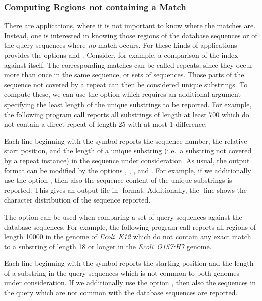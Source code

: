 \documentclass[12pt,titlepage]{article}
\newcommand{\EcoliKtwelve}[0]{\emph{Ecoli~K12}\index{Ecoli~K12}\xspace}
\newcommand{\EcoliH}[0]{\emph{Ecoli~O157:H7}\index{Ecoli~O157:H7}\xspace}
\newcommand{\EXECUTE}[1]{}
\begin{document}
\begin{AboutVmatch}
\subsubsection{Computing Regions not containing a Match}

There are applications, where it is not important to know where the matches
are. Instead, one is interested in knowing those regions of the database
sequences or of the query sequences where \emph{no} match occurs. 
For these kinds of applications
\VM provides the options  and .
Consider, for example, a comparison of the index against itself. The 
corresponding matches can be called repeats, since they occur more than once 
in the same sequence, or sets of sequences. Those parts of the sequence not
covered by a repeat can then be considered unique substrings. To 
compute these, we can use the option  which requires an 
additional argument specifying the least length of the unique substrings
to be reported. For example, the following program 
call reports all substrings of length
at least 700 which do not contain a direct repeat of length 25 with at
most 1 difference:

\EXECUTE{vmatch -dbnomatch 700 -l 25 -e 1 atEST}

Each line beginning with the symbol \Fastastart
reports the sequence number, the relative start position,
and the length of a unique substring (i.e.\ a substring not covered by
a repeat instance) in the sequence under consideration.
As usual, the output format can be modified by the options
, , , and
. For example, if we additionally use the option 
, then also the sequence content
of the unique substrings is reported. This gives an output file in 
\Fasta-format. Additionally, the \texttt{}-line
shows the character distribution of the sequence reported.

The option  can be used when comparing 
a set of query sequences against the database sequences.
For example, the following program call reports all regions of length 10000 in 
the genome of \EcoliKtwelve which do not contain any exact match to
a substring of length 18 or longer in the \EcoliH genome.

\EXECUTE{vmatch -qnomatch 10000 -q EcoliK12 -l 18 EcoliO157H7}

Each line beginning with the symbol \Fastastart
reports the starting position and the length of a substring in the
query sequences which is not common to both genomes under consideration.
If we additionally use the option , then also the
sequences in the query which are not common with the database sequences
are reported. 


\end{AboutVmatch}
\end{document}
